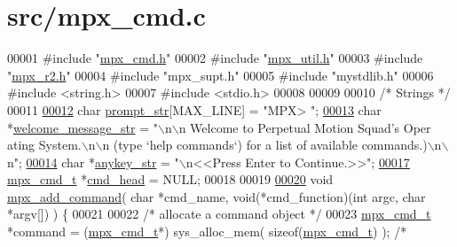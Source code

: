 \hypertarget{mpx__cmd_8c_source}{
\section{src/mpx\_\-cmd.c}
}

\begin{DoxyCode}
00001 \textcolor{preprocessor}{#include "\hyperlink{mpx__cmd_8h}{mpx_cmd.h}"}
00002 \textcolor{preprocessor}{#include "\hyperlink{mpx__util_8h}{mpx_util.h}"}
00003 \textcolor{preprocessor}{#include "\hyperlink{mpx__r2_8h}{mpx_r2.h}"}
00004 \textcolor{preprocessor}{#include "mpx\_supt.h"}
00005 \textcolor{preprocessor}{#include "mystdlib.h"}
00006 \textcolor{preprocessor}{#include <string.h>}
00007 \textcolor{preprocessor}{#include <stdio.h>}
00008 
00009 
00010 \textcolor{comment}{/* Strings */}
00011 
\hypertarget{mpx__cmd_8c_source_l00012}{}\hyperlink{mpx__cmd_8c_a4d455760d7d89fa6a1c1559f7b6acdf7}{00012} \textcolor{keywordtype}{char} \hyperlink{mpx__cmd_8c_a4d455760d7d89fa6a1c1559f7b6acdf7}{prompt_str}[MAX\_LINE]       = \textcolor{stringliteral}{"MPX> "}; 
\hypertarget{mpx__cmd_8c_source_l00013}{}\hyperlink{mpx__cmd_8c_a9f8c83d01b06ce3619ac78c395f9cdd1}{00013} \textcolor{keywordtype}{char} *\hyperlink{mpx__cmd_8c_a9f8c83d01b06ce3619ac78c395f9cdd1}{welcome_message_str}       = \textcolor{stringliteral}{"\(\backslash\)n\(\backslash\)n  Welcome to Perpetual Motion Squad's Oper
      ating System.\(\backslash\)n\(\backslash\)n    (type `help commands`) for a list of available commands.)\(\backslash\)n\(\backslash\)
      n"};  
\hypertarget{mpx__cmd_8c_source_l00014}{}\hyperlink{mpx__cmd_8c_a35b541517c624b5cabacaaa78ac41c70}{00014} \textcolor{keywordtype}{char} *\hyperlink{mpx__cmd_8c_a35b541517c624b5cabacaaa78ac41c70}{anykey_str}                = \textcolor{stringliteral}{"\(\backslash\)n<<Press Enter to Continue.>>"};
\hypertarget{mpx__cmd_8c_source_l00017}{}\hyperlink{mpx__cmd_8c_af2d59668915a0a985c5301d887031811}{00017} \hyperlink{structmpx__cmd}{mpx_cmd_t} *\hyperlink{mpx__cmd_8c_af2d59668915a0a985c5301d887031811}{cmd_head} = NULL;
00018 
00019 
\hypertarget{mpx__cmd_8c_source_l00020}{}\hyperlink{mpx__cmd_8c_a52c02eb85fda9ac4278e10088a192e89}{00020} \textcolor{keywordtype}{void} \hyperlink{mpx__cmd_8c_a52c02eb85fda9ac4278e10088a192e89}{mpx_add_command}( \textcolor{keywordtype}{char} *cmd\_name, \textcolor{keywordtype}{void}(*cmd\_function)(\textcolor{keywordtype}{int} argc, \textcolor{keywordtype}{char} *argv[])
       ) \{
00021 
00022         \textcolor{comment}{/* allocate a command object */}
00023         \hyperlink{structmpx__cmd}{mpx_cmd_t} *command = (\hyperlink{structmpx__cmd}{mpx_cmd_t}*) sys\_alloc\_mem( \textcolor{keyword}{sizeof}(\hyperlink{structmpx__cmd}{mpx_cmd_t}) ); \textcolor{comment}{/* 
}
\end{DoxyCode}
